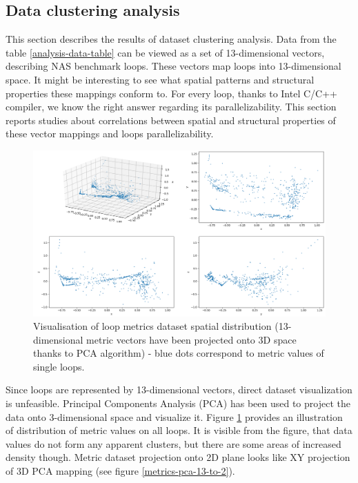 \subsection{Data clustering analysis}
\label{analysis-data-clustering-analysis}
\qquad This section describes the results of dataset clustering analysis. Data from the table \ref{analysis-data-table} can be viewed as a set of 13-dimensional vectors, describing NAS benchmark loops. These vectors map loops into 13-dimensional space. It might be interesting to see what spatial patterns and structural properties these mappings conform to. For every loop, thanks to Intel C/C++ compiler, we know the right answer regarding its parallelizability. This section reports studies about correlations between spatial and structural properties of these vector mappings and loops parallelizability.\newline
\begin{figure}[H]
\centering
\includegraphics[width=\linewidth]{figs/metrics-pca-13-to-3.png}
\caption{Visualisation of loop metrics dataset spatial distribution (13-dimensional metric vectors have been projected onto 3D space thanks to PCA algorithm) - blue dots correspond to metric values of single loops.}
\label{metrics-pca-13-to-3}
\end{figure} 
\null\qquad Since loops are represented by 13-dimensional vectors, direct dataset visualization is unfeasible. Principal Components Analysis (PCA) has been used to project the data onto 3-dimensional space and visualize it. Figure \ref{metrics-pca-13-to-3} provides an illustration of distribution of metric values on all loops. It is visible from the figure, that data values do not form any apparent clusters, but there are some areas of increased density though. Metric dataset projection onto 2D plane looks like XY projection of 3D PCA mapping (see figure \ref{metrics-pca-13-to-2}).\newline
